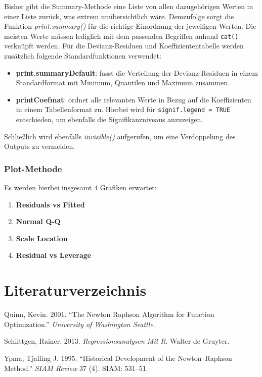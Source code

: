 \documentclass[12pt,]{article}
\providecommand{\tightlist}{%
  \setlength{\itemsep}{0pt}\setlength{\parskip}{0pt}}
\begin{document}
Bisher gibt die Summary-Methode eine Liste von allen dazugehörigen
Werten in einer Liste zurück, was extrem unübersichtlich wäre.
Demzufolge sorgt die Funktion \emph{print.summary()} für die richtige
Einordnung der jeweiligen Werten. Die meisten Werte müssen lediglich mit
dem passenden Begriffen anhand \texttt{cat()} verknüpft werden. Für die
Devianz-Residuen und Koeffiziententabelle werden zusätzlich folgende
Standardfunktionen verwendet:

\begin{itemize}
\tightlist
\item
  \textbf{print.summaryDefault}: fasst die Verteilung der
  Devianz-Residuen in einem Standardformat mit Minimum, Quantilen und
  Maximum zusammen.
\item
  \textbf{printCoefmat}: ordnet alle relevanten Werte in Bezug auf die
  Koeffizienten in einem Tabellenformat zu. Hierbei wird für
  \texttt{signif.legend\ =\ TRUE} entschieden, um ebenfalls die
  Signifikanzniveaus anzuzeigen.
\end{itemize}

Schließlich wird ebenfalls \emph{invisible()} aufgerufen, um eine
Verdoppelung des Outputs zu vermeiden.

\subsubsection{Plot-Methode}\label{plot-methode}

Es werden hierbei insgesamt 4 Grafiken erwartet:

\begin{enumerate}
\def\labelenumi{\arabic{enumi}.}
\tightlist
\item
  \textbf{Residuals vs Fitted}
\item
  \textbf{Normal Q-Q}
\item
  \textbf{Scale Location}
\item
  \textbf{Residual vs Leverage}
\end{enumerate}

\section*{Literaturverzeichnis}\label{literaturverzeichnis}

\hypertarget{refs}{}
\hypertarget{ref-quinn2001newton}{}
Quinn, Kevin. 2001. ``The Newton Raphson Algorithm for Function
Optimization.'' \emph{University of Washington Seattle}.

\hypertarget{ref-schlittgen2013regressionsanalysen}{}
Schlittgen, Rainer. 2013. \emph{Regressionsanalysen Mit R}. Walter de
Gruyter.

\hypertarget{ref-ypma1995historical}{}
Ypma, Tjalling J. 1995. ``Historical Development of the Newton--Raphson
Method.'' \emph{SIAM Review} 37 (4). SIAM: 531--51.
\end{document}
